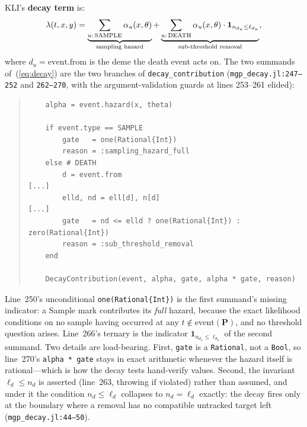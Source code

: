 \documentclass[11pt,leqno]{article}
\renewcommand{\Pr}{\mathbf{P}}      %
\newcommand{\indicator}[1]{\mathbf{1}_{#1}}
\newcommand{\code}[1]{\texttt{#1}}
\theoremstyle{plain}
\theoremstyle{definition}
\begin{document}
KLI's \textbf{decay term} is:
\begin{equation}\label{eq:decay}
  \lambda(t,x,y) = \underbrace{\sum_{u:\,\text{SAMPLE}}
    \alpha_u(x,\theta)}_{\text{sampling hazard}}
  + \underbrace{\sum_{u:\,\text{DEATH}}
    \alpha_u(x,\theta) \cdot \indicator{n_{d_u} \le \ell_{d_u}}}_{%
    \text{sub-threshold removal}},
\end{equation}
where $d_u = \text{event.from}$ is the deme the death event acts on.
The two summands of~(\ref{eq:decay}) are the two branches of
\code{decay\_contribution} (\code{mgp\_decay.jl:247--252} and
\code{262--270}, with the argument-validation guards at lines 253--261
elided):
\begin{quote}
{\small
\begin{verbatim}
    alpha = event.hazard(x, theta)

    if event.type == SAMPLE
        gate   = one(Rational{Int})
        reason = :sampling_hazard_full
    else # DEATH
        d = event.from
[...]
        elld, nd = ell[d], n[d]
[...]
        gate   = nd <= elld ? one(Rational{Int}) : zero(Rational{Int})
        reason = :sub_threshold_removal
    end

    DecayContribution(event, alpha, gate, alpha * gate, reason)
\end{verbatim}
}
\end{quote}
Line~250's unconditional \code{one(Rational\{Int\})} is the first summand's
missing indicator: a Sample mark contributes its \emph{full} hazard, because
the exact likelihood conditions on no sample having occurred at any
$t \notin \mathrm{event}(\Pr)$, and no threshold question arises.  Line~266's
ternary is the indicator $\indicator{n_{d_u} \le \ell_{d_u}}$ of the second
summand.  Two details are load-bearing.  First, \code{gate} is a
\code{Rational}, not a \code{Bool}, so line~270's \code{alpha * gate} stays in
exact arithmetic whenever the hazard itself is rational---which is how the
decay tests hand-verify values.  Second, the invariant $\ell_d \le n_d$ is
asserted (line~263, throwing if violated) rather than assumed, and under it
the condition $n_d \le \ell_d$ collapses to $n_d = \ell_d$ exactly: the decay
fires only at the boundary where a removal has no compatible untracked target
left (\code{mgp\_decay.jl:44--50}).
\end{document}
